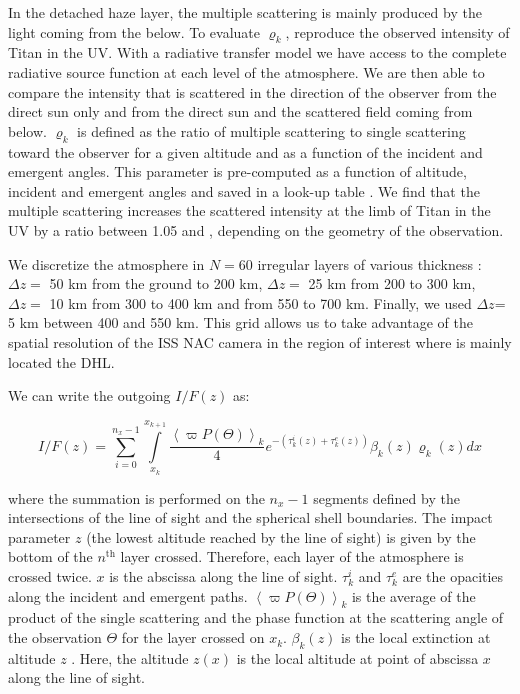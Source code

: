 In the detached haze layer, the multiple scattering is mainly produced by the light coming from the  below. To
evaluate $\varrho_k$, 
reproduce the observed intensity of Titan in the UV. With a radiative transfer model \citep[SHDOMPP, from ][]{Evans1998}
we have access to the complete radiative source function at each level of the atmosphere. We are then able to compare the
intensity that is scattered in the direction of the observer from the direct sun only and from the direct sun and the scattered
field coming from below. $\varrho_k$ is defined as the ratio of multiple scattering to single scattering toward the observer
for a given altitude and as a function of the incident and emergent angles. This parameter is pre-computed as a function of
altitude, incident and emergent angles and saved in a look-up table \citep[see.][for details]{West2018}.
We find that the multiple scattering increases the scattered intensity at the limb of Titan in the UV by a ratio between
1.05 and , depending on the geometry of the observation.

We discretize the atmosphere in $N = 60$ irregular layers of various thickness : $\Delta z =$ 50 km from the
ground to 200 km, $\Delta z =$ 25 km from 200 to 300 km, $\Delta z =$ 10 km from 300 to 400 km and from 550 to 700 km.
Finally, we used $\Delta z$= 5 km between 400 and 550 km. This grid allows us to take advantage of the spatial resolution
of the ISS NAC camera in the region of interest where is mainly located the DHL.

We can write the outgoing $I/F (z)$ as:

\begin{equation}
I/F (z) = \sum_{i=0}^{n_x-1} \int\limits_{x_k}^{x_{k+1}}
\frac{\left< \varpi P(\Theta) \right>_k}{4}
e^{-\left( \tau^i_k\left(z\right) + \tau^e_k\left(z\right) \right)}
\beta_k\left(z\right) \varrho_k\left(z\right) d{x}
\label{eq:west2017_sup_limb}
\end{equation}

where the summation is performed on the $n_x-1$ segments defined by the intersections of the line of sight and the spherical shell boundaries. The impact parameter $z$ (the lowest altitude reached by the line of sight) is given by the bottom of the $n^\mathrm{th}$ layer crossed. Therefore, each layer of the atmosphere is crossed twice. $x$ is the abscissa along the line of sight. $\tau^i_k$ and $\tau^e_k$ are the opacities along the incident and emergent paths.
$\left< \varpi P(\Theta)\right>_k$ is the average of the product of the single scattering and the phase function at the scattering angle of the observation $\Theta$ for the layer crossed on $x_k$.  $\beta_k(z)$ is the local extinction  at altitude $z$ . Here, the altitude $z(x)$ is the local altitude at point of abscissa $x$ along the line of sight.


